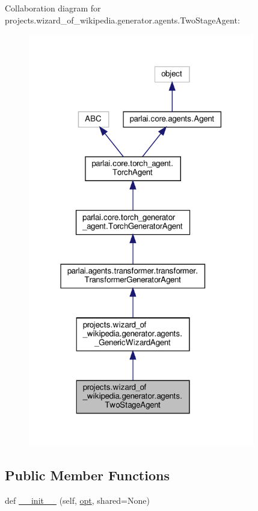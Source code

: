 Collaboration diagram for projects.\+wizard\+\_\+of\+\_\+wikipedia.\+generator.\+agents.\+Two\+Stage\+Agent\+:
\nopagebreak
\begin{figure}[H]
\begin{center}
\leavevmode
\includegraphics[width=280pt]{da/d8a/classprojects_1_1wizard__of__wikipedia_1_1generator_1_1agents_1_1TwoStageAgent__coll__graph}
\end{center}
\end{figure}
\subsection*{Public Member Functions}
\begin{DoxyCompactItemize}
\item 
def \hyperlink{classprojects_1_1wizard__of__wikipedia_1_1generator_1_1agents_1_1TwoStageAgent_a5aae49d192aac40f8fde1b1c42409261}{\+\_\+\+\_\+init\+\_\+\+\_\+} (self, \hyperlink{classparlai_1_1core_1_1torch__agent_1_1TorchAgent_a785bb920cf8c8afc3e9bf6a8b77e335a}{opt}, shared=None)
\end{DoxyCompactItemize}
